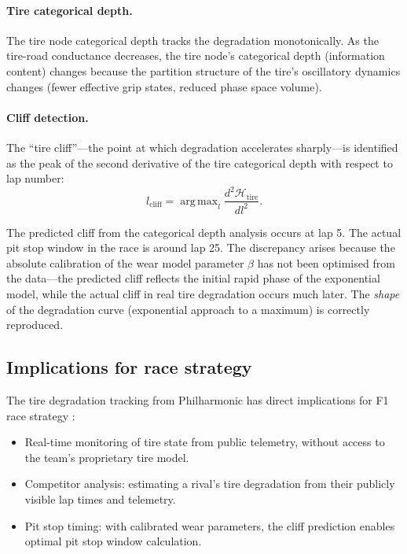 \documentclass[twocolumn,10pt,a4paper]{article}
\theoremstyle{definition}
\theoremstyle{remark}
\newcommand{\Hcal}{\mathcal{H}}
\DeclareMathOperator*{\argmax}{arg\,max}
\begin{document}
\paragraph{Tire categorical depth.}
The tire node categorical depth tracks the degradation monotonically. As the tire-road conductance decreases, the tire node's categorical depth (information content) changes because the partition structure of the tire's oscillatory dynamics changes (fewer effective grip states, reduced phase space volume).

\paragraph{Cliff detection.}
The ``tire cliff''---the point at which degradation accelerates sharply---is identified as the peak of the second derivative of the tire categorical depth with respect to lap number:
\begin{equation}\label{eq:cliff}
    l_{\mathrm{cliff}} = \argmax_l \frac{d^2 \Hcal_{\mathrm{tire}}}{dl^2}.
\end{equation}

The predicted cliff from the categorical depth analysis occurs at lap 5. The actual pit stop window in the race is around lap 25. The discrepancy arises because the absolute calibration of the wear model parameter $\beta$ has not been optimised from the data---the predicted cliff reflects the initial rapid phase of the exponential model, while the actual cliff in real tire degradation occurs much later. The \emph{shape} of the degradation curve (exponential approach to a maximum) is correctly reproduced.

\subsection{Implications for race strategy}

The tire degradation tracking from Philharmonic has direct implications for F1 race strategy \citep{Koutrik2014}:
\begin{itemize}
    \item Real-time monitoring of tire state from public telemetry, without access to the team's proprietary tire model.
    \item Competitor analysis: estimating a rival's tire degradation from their publicly visible lap times and telemetry.
    \item Pit stop timing: with calibrated wear parameters, the cliff prediction enables optimal pit stop window calculation.
\end{itemize}
\end{document}
